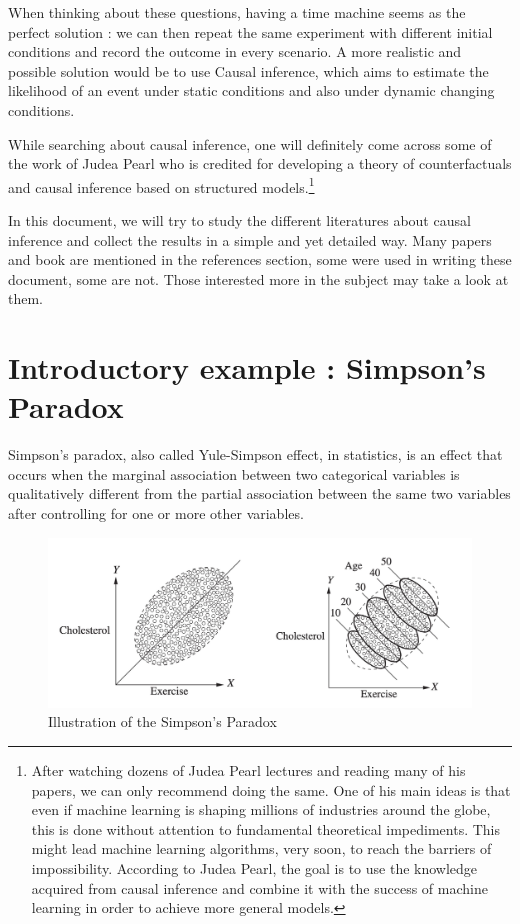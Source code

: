 \documentclass{article}
\begin{document}
When thinking about these questions, having a time machine seems as the perfect solution : we can then repeat the same experiment with different initial conditions and record the outcome in every scenario. A more realistic and possible solution would be to use Causal inference, which aims to estimate the likelihood of an event under static conditions and also under dynamic changing conditions.

While searching about causal inference, one will definitely come across some of the work of Judea Pearl who is credited for developing a theory of counterfactuals and causal inference based on structured models.\footnote{After watching dozens of Judea Pearl lectures and reading many of his papers, we can only recommend doing the same. One of his main ideas is that even if machine learning is shaping millions of industries around the globe, this is done without attention to fundamental theoretical impediments. This might lead machine learning algorithms, very soon, to reach the barriers of impossibility. According to Judea Pearl, the goal is to use the knowledge acquired from causal inference and combine it with the success of machine learning in order to achieve more general models.}

In this document, we will try to study the different literatures about causal inference and collect the results in a simple and yet detailed way. Many papers and book are mentioned in the references section, some were used in writing these document, some are not. Those interested more in the subject may take a look at them.  


\newpage




\section{Introductory example : Simpson's Paradox}

Simpson’s paradox, also called Yule-Simpson effect, in statistics, is an effect that occurs when the marginal association between two categorical variables is qualitatively different from the partial association between the same two variables after controlling for one or more other variables.

\begin{figure}[h]
\centering
\includegraphics[width=0.7 \textwidth]{../figures/simpson.png}
\caption{Illustration of the Simpson’s Paradox\cite{pearl2016causal}}
\end{figure}
\end{document}
